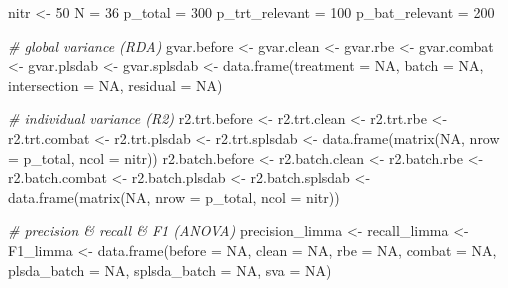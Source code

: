 \documentclass[
]{book}
\newenvironment{Shaded}{\begin{snugshade}}{\end{snugshade}}
\newcommand{\AttributeTok}[1]{\textcolor[rgb]{0.77,0.63,0.00}{#1}}
\newcommand{\CommentTok}[1]{\textcolor[rgb]{0.56,0.35,0.01}{\textit{#1}}}
\newcommand{\ConstantTok}[1]{\textcolor[rgb]{0.00,0.00,0.00}{#1}}
\newcommand{\DecValTok}[1]{\textcolor[rgb]{0.00,0.00,0.81}{#1}}
\newcommand{\FunctionTok}[1]{\textcolor[rgb]{0.00,0.00,0.00}{#1}}
\newcommand{\NormalTok}[1]{#1}
\newcommand{\OtherTok}[1]{\textcolor[rgb]{0.56,0.35,0.01}{#1}}
\begin{document}
\begin{Shaded}
\begin{Highlighting}[]
\NormalTok{nitr }\OtherTok{\textless{}{-}} \DecValTok{50}
\NormalTok{N }\OtherTok{=} \DecValTok{36}
\NormalTok{p\_total }\OtherTok{=} \DecValTok{300}
\NormalTok{p\_trt\_relevant }\OtherTok{=} \DecValTok{100} 
\NormalTok{p\_bat\_relevant }\OtherTok{=} \DecValTok{200} 

\CommentTok{\# global variance (RDA)}
\NormalTok{gvar.before }\OtherTok{\textless{}{-}}\NormalTok{ gvar.clean }\OtherTok{\textless{}{-}} 
\NormalTok{  gvar.rbe }\OtherTok{\textless{}{-}}\NormalTok{ gvar.combat }\OtherTok{\textless{}{-}} 
\NormalTok{  gvar.plsdab }\OtherTok{\textless{}{-}}\NormalTok{ gvar.splsdab }\OtherTok{\textless{}{-}} \FunctionTok{data.frame}\NormalTok{(}\AttributeTok{treatment =} \ConstantTok{NA}\NormalTok{, }\AttributeTok{batch =} \ConstantTok{NA}\NormalTok{,  }
                                            \AttributeTok{intersection =} \ConstantTok{NA}\NormalTok{, }
                                            \AttributeTok{residual =} \ConstantTok{NA}\NormalTok{)}

\CommentTok{\# individual variance (R2)}
\NormalTok{r2.trt.before }\OtherTok{\textless{}{-}}\NormalTok{ r2.trt.clean }\OtherTok{\textless{}{-}} 
\NormalTok{  r2.trt.rbe  }\OtherTok{\textless{}{-}}\NormalTok{ r2.trt.combat }\OtherTok{\textless{}{-}} 
\NormalTok{  r2.trt.plsdab }\OtherTok{\textless{}{-}}\NormalTok{ r2.trt.splsdab }\OtherTok{\textless{}{-}} \FunctionTok{data.frame}\NormalTok{(}\FunctionTok{matrix}\NormalTok{(}\ConstantTok{NA}\NormalTok{, }\AttributeTok{nrow =}\NormalTok{ p\_total, }
                                                       \AttributeTok{ncol =}\NormalTok{ nitr))}
\NormalTok{r2.batch.before }\OtherTok{\textless{}{-}}\NormalTok{ r2.batch.clean }\OtherTok{\textless{}{-}} 
\NormalTok{  r2.batch.rbe  }\OtherTok{\textless{}{-}}\NormalTok{ r2.batch.combat }\OtherTok{\textless{}{-}} 
\NormalTok{  r2.batch.plsdab }\OtherTok{\textless{}{-}}\NormalTok{ r2.batch.splsdab }\OtherTok{\textless{}{-}} \FunctionTok{data.frame}\NormalTok{(}\FunctionTok{matrix}\NormalTok{(}\ConstantTok{NA}\NormalTok{, }\AttributeTok{nrow =}\NormalTok{ p\_total, }
                                                           \AttributeTok{ncol =}\NormalTok{ nitr))}

\CommentTok{\# precision \& recall \& F1 (ANOVA)}
\NormalTok{precision\_limma }\OtherTok{\textless{}{-}}\NormalTok{ recall\_limma }\OtherTok{\textless{}{-}}\NormalTok{ F1\_limma }\OtherTok{\textless{}{-}} 
  \FunctionTok{data.frame}\NormalTok{(}\AttributeTok{before =} \ConstantTok{NA}\NormalTok{, }\AttributeTok{clean =} \ConstantTok{NA}\NormalTok{, }
             \AttributeTok{rbe =} \ConstantTok{NA}\NormalTok{, }\AttributeTok{combat =} \ConstantTok{NA}\NormalTok{, }
             \AttributeTok{plsda\_batch =} \ConstantTok{NA}\NormalTok{, }\AttributeTok{splsda\_batch =} \ConstantTok{NA}\NormalTok{, }
             \AttributeTok{sva =} \ConstantTok{NA}\NormalTok{)}


\end{Highlighting}
\end{Shaded}
\end{document}
